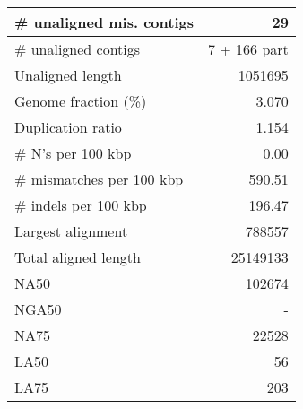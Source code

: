 \documentclass[12pt,a4paper]{article}
\begin{document}
\begin{table}[ht]
\begin{center}
\begin{tabular}{|l*{1}{|r}|}
\# unaligned mis. contigs & 29 \\ \hline
\# unaligned contigs & 7 + 166 part \\ \hline
Unaligned length & 1051695 \\ \hline
Genome fraction (\%) & 3.070 \\ \hline
Duplication ratio & 1.154 \\ \hline
\# N's per 100 kbp & 0.00 \\ \hline
\# mismatches per 100 kbp & 590.51 \\ \hline
\# indels per 100 kbp & 196.47 \\ \hline
Largest alignment & 788557 \\ \hline
Total aligned length & 25149133 \\ \hline
NA50 & 102674 \\ \hline
NGA50 & - \\ \hline
NA75 & 22528 \\ \hline
LA50 & 56 \\ \hline
LA75 & 203 \\ \hline
\end{tabular}
\end{center}
\end{table}
\end{document}
